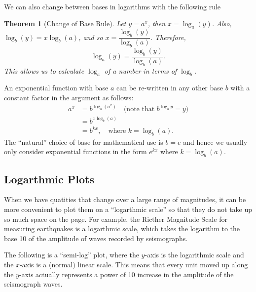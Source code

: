 \documentclass[
]{book}
\newtheorem{theorem}{Theorem}[chapter]
\theoremstyle{definition}
\theoremstyle{definition}
\theoremstyle{definition}
\theoremstyle{definition}
\theoremstyle{remark}
\begin{document}
We can also change between bases in logarithms with the following rule

\begin{theorem}[Change of Base Rule]
\protect\hypertarget{thm:changebase}{}\label{thm:changebase}Let \(y=a^x\), then \(x=\log_a(y)\). Also, \(\log_b(y)=x\log_b(a)\), and so \(x=\dfrac{\log_b(y)}{\log_b(a)}\). Therefore,
\begin{equation*}
\log_a(y)=\dfrac{\log_b (y)}{\log_b (a)}.
\end{equation*}
This allows us to calculate \(\log_a\) of a number in terms of \(\log_b\).
\end{theorem}

An exponential function with base \(a\) can be re-written in any other base \(b\) with a constant factor in the argument as follows:
\begin{align*}
a^x&=b^{\log_b (a^x)} \quad \text{(note that $b^{\log_b y}=y$)} \\
&=b^{x\log_b (a)}\\
&=b^{kx},\quad \text{where }k=\log_b(a).
\end{align*}
The ``natural'' choice of base for mathematical use is \(b=e\) and hence we usually only consider exponential functions in the form \(e^{kx}\) where \(k=\log_b(a)\).

\hypertarget{logarthmic-plots}{%
\subsection{Logarthmic Plots}\label{logarthmic-plots}}

When we have quatities that change over a large range of magnitudes, it can be more convenient to plot them on a ``logarthmic scale'' so that they do not take up so much space on the page. For example, the Ricther Magnitude Scale for measuring earthquakes is a logarthmic scale, which takes the logarithm to the base 10 of the amplitude of waves recorded by seismographs.

The following is a ``semi-log'' plot, where the \(y\)-axis is the logarithmic scale and the \(x\)-axis is a (normal) linear scale. This means that every unit moved up along the \(y\)-axis actually represents a power of 10 increase in the amplitude of the seismograph waves.
\end{document}
